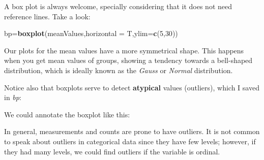 \documentclass[]{article}
\newenvironment{Shaded}{\begin{snugshade}}{\end{snugshade}}
\newcommand{\KeywordTok}[1]{\textcolor[rgb]{0.13,0.29,0.53}{\textbf{#1}}}
\newcommand{\DataTypeTok}[1]{\textcolor[rgb]{0.13,0.29,0.53}{#1}}
\newcommand{\DecValTok}[1]{\textcolor[rgb]{0.00,0.00,0.81}{#1}}
\newcommand{\FloatTok}[1]{\textcolor[rgb]{0.00,0.00,0.81}{#1}}
\newcommand{\StringTok}[1]{\textcolor[rgb]{0.31,0.60,0.02}{#1}}
\newcommand{\OperatorTok}[1]{\textcolor[rgb]{0.81,0.36,0.00}{\textbf{#1}}}
\newcommand{\NormalTok}[1]{#1}
\begin{document}
A box plot is always welcome, specially considering that it does not
need reference lines. Take a look:

\begin{Shaded}
\begin{Highlighting}[]
\NormalTok{bp=}\KeywordTok{boxplot}\NormalTok{(meanValues,}\DataTypeTok{horizontal =}\NormalTok{ T,}\DataTypeTok{ylim=}\KeywordTok{c}\NormalTok{(}\DecValTok{5}\NormalTok{,}\DecValTok{30}\NormalTok{))}
\end{Highlighting}
\end{Shaded}

Our plots for the mean values have a more symmetrical shape. This
happens when you get mean values of groups, showing a tendency towards a
bell-shaped distribution, which is ideally known as the \emph{Gauss} or
\emph{Normal} distribution.

Notice also that boxplots serve to detect \textbf{atypical} values
(outliers), which I saved in \emph{bp}:

\begin{Shaded}
\end{Shaded}

We could annotate the boxplot like this:

\begin{Shaded}
\end{Shaded}

In general, measurements and counts are prone to have outliers. It is
not common to speak about outliers in categorical data since they have
few levels; however, if they had many levels, we could find outliers if
the variable is ordinal.
\end{document}
